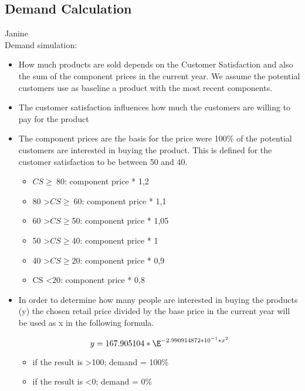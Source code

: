 \subsection{Demand Calculation}

Janine \\
Demand simulation: 
\begin{itemize}
\item How much products are sold depends on the Customer Satisfaction and also the sum of the component prices in the current year. We assume the potential customers use as baseline a product with the most recent components. 
\item The customer satisfaction influences how much the customers are willing to pay for the product 
\item The component prices are the basis for the price were 100\% of the potential customers are interested in buying the product. This is defined for the customer satisfaction to be between 50 and 40.

\begin{itemize}
\item $CS \geq \ $80: component price * 1,2 
\item 80 \textgreater $CS \geq \ $60: component price * 1,1
\item 60 \textgreater $CS \geq $50: component price * 1,05
\item 50 \textgreater $CS \geq $40: component price * 1
\item 40 \textgreater $CS \geq $20: component price * 0,9
\item CS \textless 20: component price * 0,8
\end{itemize}

\item In order to determine how many people are interested in buying the products (y) the chosen retail price divided by the base price in the current year will be used as x in the following formula.

\begin{equation}
    y = 167.905104 * \E^{ -2.990914872 * 10^{ -1 } * x^{ 2 }}
\end{equation}

\begin{itemize}
    \item if the result is \textgreater 100; demand = 100\%
    \item if the result is \textless 0; demand = 0\%
\end{itemize}
\end{itemize}